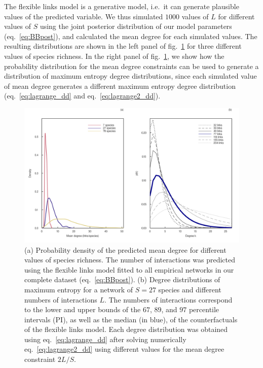 \documentclass[11pt]{article}
\makeatletter
\def\maxwidth{\ifdim\Gin@nat@width>\linewidth\linewidth
\else\Gin@nat@width\fi}
\let\Oldincludegraphics\includegraphics
\renewcommand{\includegraphics}[1]{\Oldincludegraphics[width=\maxwidth]{#1}}
\makeatother
\begin{document}
The flexible links model is a generative model, i.e.~it can generate
plausible values of the predicted variable. We thus simulated \(1000\)
values of \(L\) for different values of \(S\) using the joint posterior
distribution of our model parameters (eq.~\ref{eq:BBpost}), and
calculated the mean degree for each simulated values. The resulting
distributions are shown in the left panel of
fig.~\ref{fig:degree_dist_fl} for three different values of species
richness. In the right panel of fig.~\ref{fig:degree_dist_fl}, we show
how the probability distribution for the mean degree constraints can be
used to generate a distribution of maximum entropy degree distributions,
since each simulated value of mean degree generates a different maximum
entropy degree distribution (eq.~\ref{eq:lagrange_dd} and
eq.~\ref{eq:lagrange2_dd}).

\begin{figure}
\hypertarget{fig:degree_dist_fl}{%
\centering
\includegraphics{figures/maxent_degree_dist_fl.png}
\caption{(a) Probability density of the predicted mean degree for
different values of species richness. The number of interactions was
predicted using the flexible links model fitted to all empirical
networks in our complete dataset (eq.~\ref{eq:BBpost}). (b) Degree
distributions of maximum entropy for a network of \(S=27\) species and
different numbers of interactions \(L\). The numbers of interactions
correspond to the lower and upper bounds of the \(67%
\), \(89%
\), and \(97%
\) percentile intervals (PI), as well as the median (in blue), of the
counterfactuals of the flexible links model. Each degree distribution
was obtained using eq.~\ref{eq:lagrange_dd} after solving numerically
eq.~\ref{eq:lagrange2_dd} using different values for the mean degree
constraint \(2L/S\).}\label{fig:degree_dist_fl}
}
\end{figure}
\end{document}
